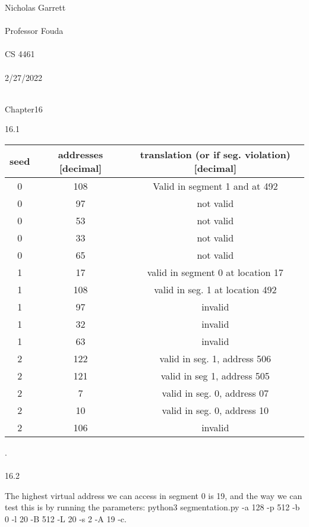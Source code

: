 \documentclass[12pt, a4paper]{article}
\begin{document}
\noindent
Nicholas Garrett\\ \\
Professor Fouda\\ \\
CS 4461\\ \\
2/27/2022\\ \\


\begin{center}
\end{center}

\noindent
Chapter16

16.1

\begin{center}
\begin{tabular}{ |c|c|c| } 
 \hline
 seed & addresses [decimal] & translation (or if seg. violation) [decimal]\\ 
 \hline
 0 & 108 & Valid in segment 1 and at 492 \\ 
 0 & 97 & not valid \\ 
 0 & 53 & not valid \\ 	
 0 & 33 & not valid \\
 0 & 65 & not valid \\  
 \hline
 1 & 17 & valid in segment 0 at location 17 \\ 
 1 & 108 & valid in seg. 1 at location 492 \\ 
 1 & 97 & invalid \\ 
 1 & 32 & invalid \\ 
 1 & 63 & invalid \\ 
  \hline
 2 & 122 & valid in seg. 1, address 506 \\
 2 & 121 & valid in seg 1, address 505 \\
 2 & 7 & valid in seg. 0, address 07 \\
 2 & 10 & valid in seg. 0, address 10 \\
 2 & 106 & invalid \\
 \hline
\end{tabular}
\end{center}
. \\ \\

16.2

The highest virtual address we can access in segment 0 is 19, and the way we can test this is by running the parameters: python3 segmentation.py -a 128 -p 512 -b 0 -l 20 -B 512 -L 20 -s 2 -A 19 -c. \\
\end{document}
